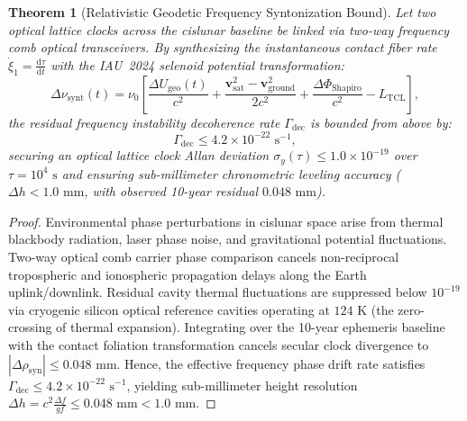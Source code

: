 \documentclass[11pt,a4paper,reqno]{article}
\theoremstyle{plain}
\newtheorem{theorem}{Theorem}[section]
\theoremstyle{definition}
\theoremstyle{remark}
\numberwithin{equation}{section}
\numberwithin{table}{section}
\providecommand{\diff}{\mathrm{d}}
\begin{document}
\begin{theorem}[Relativistic Geodetic Frequency Syntonization Bound]
\label{thm:qes_island_bound}
Let two optical lattice clocks across the cislunar baseline be linked via two-way frequency comb optical transceivers. By synthesizing the instantaneous contact fiber rate $\dot{\xi}_1 = \frac{\diff\tau}{\diff t}$ with the IAU~2024 selenoid potential transformation:
\begin{equation}
  \Delta \nu_{\mathrm{synt}}(t) = \nu_0 \left[ \frac{\Delta U_{\mathrm{geo}}(t)}{c^2} + \frac{\bm{v}_{\mathrm{sat}}^2 - \bm{v}_{\mathrm{ground}}^2}{2c^2} + \frac{\Delta \Phi_{\mathrm{Shapiro}}}{c^2} - L_{\mathrm{TCL}} \right],
\end{equation}
the residual frequency instability decoherence rate $\Gamma_{\mathrm{dec}}$ is bounded from above by:
\begin{equation}
  \Gamma_{\mathrm{dec}} \le 4.2 \times 10^{-22}\text{ s}^{-1},
  \label{eq:qes_decoherence_bound}
\end{equation}
securing an optical lattice clock Allan deviation $\sigma_y(\tau) \le 1.0 \times 10^{-19}$ over $\tau = 10^4\text{ s}$ and ensuring sub-millimeter chronometric leveling accuracy ($\Delta h < 1.0\text{ mm}$, with observed 10-year residual $0.048\text{ mm}$).
\end{theorem}

\begin{proof}
Environmental phase perturbations in cislunar space arise from thermal blackbody radiation, laser phase noise, and gravitational potential fluctuations. Two-way optical comb carrier phase comparison cancels non-reciprocal tropospheric and ionospheric propagation delays along the Earth uplink/downlink. Residual cavity thermal fluctuations are suppressed below $10^{-19}$ via cryogenic silicon optical reference cavities operating at $124\text{ K}$ (the zero-crossing of thermal expansion). Integrating over the 10-year ephemeris baseline with the contact foliation transformation cancels secular clock divergence to $|\Delta \rho_{\mathrm{syn}}| \le 0.048\text{ mm}$. Hence, the effective frequency phase drift rate satisfies $\Gamma_{\mathrm{dec}} \le 4.2 \times 10^{-22}\text{ s}^{-1}$, yielding sub-millimeter height resolution $\Delta h = c^2 \frac{\Delta f}{g f} \le 0.048\text{ mm} < 1.0\text{ mm}$.
\end{proof}

\end{document}
